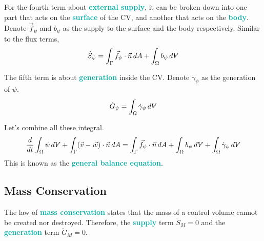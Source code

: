 \documentclass[twoside]{article}
\makeatletter
\DeclareRobustCommand{\vol}{\text{\volumedash}V}
\newcommand{\volumedash}{%
	\makebox[0pt][l]{%
		\ooalign{\hfil\hphantom{$\m@th V$}\hfil\cr\kern0.16em\rotatebox{27.5}{\textbf{--}}\hfil\cr}%
	}%
}
\newcommand{\highlightbluetext}[1]{\textcolor[HTML]{09ACA6}{\textbf{#1}}}
\numberwithin{equation}{section}
\makeatother
\begin{document}
	For the fourth term about \highlightbluetext{external supply}, it can be broken down into one part that acts on the \highlightbluetext{surface} of the CV, and another that acts on the \highlightbluetext{body}. Denote $\vec{f}_\psi$ and $b_\psi$ as the supply to the surface and the body respectively. Similar to the flux terms,
	\begin{equation}
		\dot{S}_\psi = \int_\Gamma \vec{f}_\psi \cdot \vec{n} \, dA+\int_\Omega b_\psi \, d\vol
		\label{eq:SupplyIntegral}
	\end{equation}
	
	The fifth term is about \highlightbluetext{generation} inside the CV. Denote $\dot{\gamma}_\psi$ as the generation of $\psi$.
	\begin{equation}
		\dot{G}_\psi = \int_\Omega \dot{\gamma}_\psi \, d\vol
		\label{eq:GenerationIntegral}
	\end{equation}
	
	Let's combine all these integral.
	\begin{equation}
		\frac{d}{dt} \int_\Omega \psi \, d\vol+\int_\Gamma (\vec{v}-\vec{w}) \cdot \vec{n} \, dA = \int_\Gamma \vec{f}_\psi \cdot \vec{n} \, dA+\int_\Omega b_\psi \, d\vol+\int_\Omega \dot{\gamma}_\psi \, d\vol
		\label{eq:GeneralBalanceEquationIntegral}
	\end{equation}
	This is known as the \highlightbluetext{general balance equation}.
	
	\subsection{Mass Conservation}
	\label{subsec:MassConservation}
	
	The law of \highlightbluetext{mass conservation} states that the mass of a control volume cannot be created nor destroyed. Therefore, the \highlightbluetext{supply} term $\dot{S}_M = 0$ and the \highlightbluetext{generation} term $\dot{G}_M = 0$.
	
\end{document}
